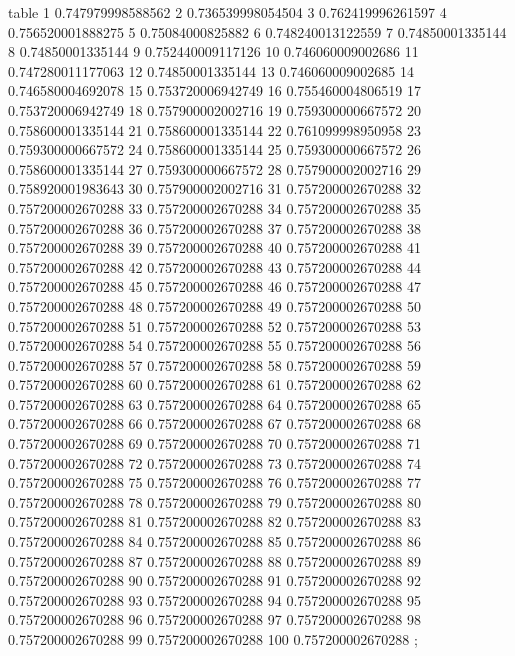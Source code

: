 table {%
	1 0.747979998588562
	2 0.736539998054504
	3 0.762419996261597
	4 0.756520001888275
	5 0.75084000825882
	6 0.748240013122559
	7 0.74850001335144
	8 0.74850001335144
	9 0.752440009117126
	10 0.746060009002686
	11 0.747280011177063
	12 0.74850001335144
	13 0.746060009002685
	14 0.746580004692078
	15 0.753720006942749
	16 0.755460004806519
	17 0.753720006942749
	18 0.757900002002716
	19 0.759300000667572
	20 0.758600001335144
	21 0.758600001335144
	22 0.761099998950958
	23 0.759300000667572
	24 0.758600001335144
	25 0.759300000667572
	26 0.758600001335144
	27 0.759300000667572
	28 0.757900002002716
	29 0.758920001983643
	30 0.757900002002716
	31 0.757200002670288
	32 0.757200002670288
	33 0.757200002670288
	34 0.757200002670288
	35 0.757200002670288
	36 0.757200002670288
	37 0.757200002670288
	38 0.757200002670288
	39 0.757200002670288
	40 0.757200002670288
	41 0.757200002670288
	42 0.757200002670288
	43 0.757200002670288
	44 0.757200002670288
	45 0.757200002670288
	46 0.757200002670288
	47 0.757200002670288
	48 0.757200002670288
	49 0.757200002670288
	50 0.757200002670288
	51 0.757200002670288
	52 0.757200002670288
	53 0.757200002670288
	54 0.757200002670288
	55 0.757200002670288
	56 0.757200002670288
	57 0.757200002670288
	58 0.757200002670288
	59 0.757200002670288
	60 0.757200002670288
	61 0.757200002670288
	62 0.757200002670288
	63 0.757200002670288
	64 0.757200002670288
	65 0.757200002670288
	66 0.757200002670288
	67 0.757200002670288
	68 0.757200002670288
	69 0.757200002670288
	70 0.757200002670288
	71 0.757200002670288
	72 0.757200002670288
	73 0.757200002670288
	74 0.757200002670288
	75 0.757200002670288
	76 0.757200002670288
	77 0.757200002670288
	78 0.757200002670288
	79 0.757200002670288
	80 0.757200002670288
	81 0.757200002670288
	82 0.757200002670288
	83 0.757200002670288
	84 0.757200002670288
	85 0.757200002670288
	86 0.757200002670288
	87 0.757200002670288
	88 0.757200002670288
	89 0.757200002670288
	90 0.757200002670288
	91 0.757200002670288
	92 0.757200002670288
	93 0.757200002670288
	94 0.757200002670288
	95 0.757200002670288
	96 0.757200002670288
	97 0.757200002670288
	98 0.757200002670288
	99 0.757200002670288
	100 0.757200002670288
};
